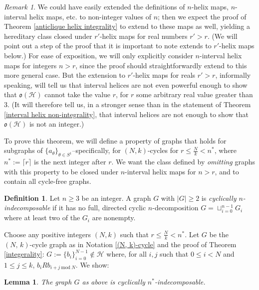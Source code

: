 \documentclass{amsart}
\newtheorem{lemma}[theorem]{Lemma}
\theoremstyle{definition}
\newtheorem{definition}[theorem]{Definition}
\theoremstyle{remark}
\newtheorem{remark}[theorem]{Remark}
\numberwithin{equation}{section}
\begin{document}
\begin{remark}\label{real-valued helix maps}
    We could have easily extended the definitions of $n$-helix maps, $n$-interval helix maps, etc. to non-integer values of $n$; then we expect the proof of Theorem \ref{anticlique helix integrality} to extend to these maps as well, yielding a hereditary class closed under $r'$-helix maps for real numbers $r' >r$. (We will point out a step of the proof that it is important to note extends to $r'$-helix maps below.) For ease of exposition, we will only explicitly consider $n$-interval helix maps for integers $n > r$, since the proof should straightforwardly extend to this more general case. But the extension to $r'$-helix maps for reals $r' > r$, informally speaking, will tell us that interval helices are not even powerful enough to show that $\mathfrak{o}(\mathcal{H})$ cannot take the value $r$, for $r$ some arbitrary real value greater than $3$. (It will therefore tell us, in a stronger sense than in the statement of Theorem \ref{interval helix non-integrality}, that interval helices are not enough to show that $\mathfrak{o}(\mathcal{H})$ is not an integer.)
\end{remark}

To prove this theorem, we will define a property of graphs that holds for subgraphs of $\{a_{\theta}\}_{\theta \in S^{1}}$--specifically, for $(N, k)$-cycles for $r \leq \frac{N}{k} < n^{*}$, where $n^{*}:= \lceil r \rceil$ is the next integer after $r$. We want the class defined by \textit{omitting} graphs with this property to be closed under $n$-interval helix maps for $n > r$, and to contain all cycle-free graphs.

\begin{definition}\label{cyclically n-indecomposable}
    Let $n \geq 3$ be an integer. A graph $G$ with $|G| \geq 2$ is \textit{cyclically $n$-indecomposable} if it has no full, directed cyclic $n$-decomposition $G = \sqcup^{n-1}_{i=0} G_{i}$ where at least two of the $G_{i}$ are nonempty.
\end{definition}

Choose any positive integers $(N, k)$ such that $r \leq \frac{N}{k} < n^{*}$. Let $G$ be the $(\textit{N, k})$-cycle graph as in Notation \ref{(N, k)-cycle} and the proof of Theorem \ref{integerality}: $G := \{b_{i}\}^{N -1}_{i =0} \notin \mathcal{H}$ where, for all $i, j$ such that $0 \leq i <N$ and $1 \leq j \leq k$,  $b_{i}R b_{i+j \mathrm{\: mod \:} N}$. We show:

\begin{lemma}\label{(N, k)-cycle cyclically n^{*}-indecomposable}
    The graph $G$ as above is cyclically $n^{*}$-indecomposable.
\end{lemma}
\end{document}
